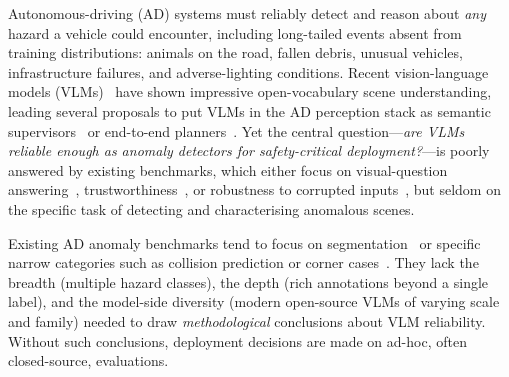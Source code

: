 \documentclass{article}
\begin{document}
Autonomous-driving (AD) systems must reliably detect and reason about
\emph{any} hazard a vehicle could encounter, including long-tailed
events absent from training distributions: animals on the road, fallen
debris, unusual vehicles, infrastructure failures, and adverse-lighting
conditions. Recent vision-language models (VLMs)~\citep{internvl3, qwen25vl,
llava_onevision} have shown impressive open-vocabulary scene
understanding, leading several proposals to put VLMs in the AD
perception stack as semantic supervisors~\citep{semantic_observer,
scvlm} or end-to-end planners~\citep{simlingo, autovla}. Yet
the central question---\emph{are VLMs reliable enough as anomaly
detectors for safety-critical deployment?}---is poorly answered by
existing benchmarks, which either focus on visual-question
answering~\citep{drivelm, nuscenes_qa, nuscenes_mqa},
trustworthiness~\citep{autotrust}, or robustness to corrupted
inputs~\citep{drivebench}, but seldom on the specific task of
detecting and characterising anomalous scenes.

Existing AD anomaly benchmarks tend to focus on
segmentation~\citep{ood_seg_survey} or specific narrow categories such
as collision prediction or corner cases~\citep{coda, tudat,
twocoool}. They lack the breadth (multiple hazard classes), the depth
(rich annotations beyond a single label), and the model-side
diversity (modern open-source VLMs of varying scale and family) needed
to draw \emph{methodological} conclusions about VLM
reliability. Without such conclusions, deployment decisions are made on
ad-hoc, often closed-source, evaluations.
\end{document}
